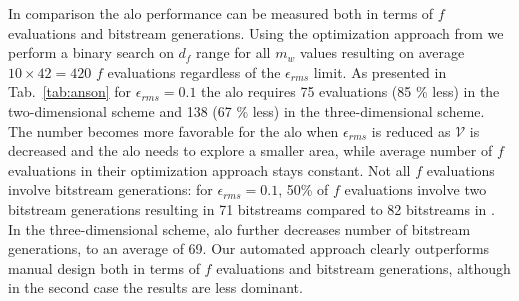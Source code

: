 \documentclass[runningheads,a4paper]{llncs}
\begin{document}
In comparison the \ac{alo} performance can be measured both in terms of $f$ evaluations and bitstream generations. Using the optimization approach from \cite{Anson2012Quad} we perform a binary search on $d_f$ range for all $m_w$ values resulting on average $10 \times 42 = 420$ $f$ evaluations regardless of the $\epsilon_{rms}$ limit. As presented in Tab.~\ref{tab:anson} for $\epsilon_{rms}=0.1$ the \ac{alo} requires 75 evaluations (85 \% less) in the two-dimensional scheme and 138 (67 \% less) in the three-dimensional scheme. The number becomes more favorable for the \ac{alo} when $\epsilon_{rms}$ is reduced as $\mathcal{V}$ is decreased and the \ac{alo} needs to explore a smaller area, while average number of $f$ evaluations in their optimization approach stays constant. Not all $f$ evaluations involve bitstream generations: for $\epsilon_{rms}=0.1$, 50\% of $f$ evaluations involve two bitstream generations resulting in 71 bitstreams compared to 82 bitstreams in \cite{Anson2012Quad}. In the three-dimensional scheme, \ac{alo} further decreases number of bitstream generations, to an average of 69. Our automated approach clearly outperforms manual design both in terms of $f$ evaluations and bitstream generations, although in the second case the results are less dominant. 









\end{document}
